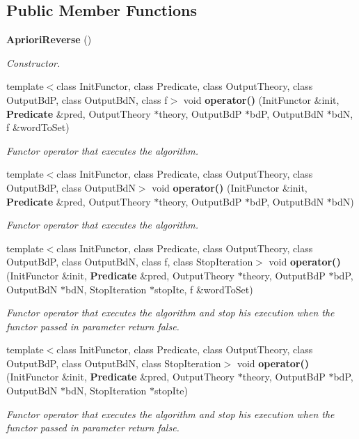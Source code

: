\subsection*{Public Member Functions}
\begin{CompactItemize}
\item 
{\bf Apriori\-Reverse} ()\label{class_apriori_reverse_18dd0f31ac2d8bc6d9036be8104bb6b8}

\begin{CompactList}\small\item\em Constructor. \item\end{CompactList}\item 
template$<$class Init\-Functor, class Predicate, class Output\-Theory, class Output\-Bd\-P, class Output\-Bd\-N, class f$>$ void {\bf operator()} (Init\-Functor \&init, {\bf Predicate} \&pred, Output\-Theory $\ast$theory, Output\-Bd\-P $\ast$bd\-P, Output\-Bd\-N $\ast$bd\-N, f \&word\-To\-Set)
\begin{CompactList}\small\item\em Functor operator that executes the algorithm. \item\end{CompactList}\item 
template$<$class Init\-Functor, class Predicate, class Output\-Theory, class Output\-Bd\-P, class Output\-Bd\-N$>$ void {\bf operator()} (Init\-Functor \&init, {\bf Predicate} \&pred, Output\-Theory $\ast$theory, Output\-Bd\-P $\ast$bd\-P, Output\-Bd\-N $\ast$bd\-N)
\begin{CompactList}\small\item\em Functor operator that executes the algorithm. \item\end{CompactList}\item 
template$<$class Init\-Functor, class Predicate, class Output\-Theory, class Output\-Bd\-P, class Output\-Bd\-N, class f, class Stop\-Iteration$>$ void {\bf operator()} (Init\-Functor \&init, {\bf Predicate} \&pred, Output\-Theory $\ast$theory, Output\-Bd\-P $\ast$bd\-P, Output\-Bd\-N $\ast$bd\-N, Stop\-Iteration $\ast$stop\-Ite, f \&word\-To\-Set)
\begin{CompactList}\small\item\em Functor operator that executes the algorithm and stop his execution when the functor passed in parameter return false. \item\end{CompactList}\item 
template$<$class Init\-Functor, class Predicate, class Output\-Theory, class Output\-Bd\-P, class Output\-Bd\-N, class Stop\-Iteration$>$ void {\bf operator()} (Init\-Functor \&init, {\bf Predicate} \&pred, Output\-Theory $\ast$theory, Output\-Bd\-P $\ast$bd\-P, Output\-Bd\-N $\ast$bd\-N, Stop\-Iteration $\ast$stop\-Ite)
\begin{CompactList}\small\item\em Functor operator that executes the algorithm and stop his execution when the functor passed in parameter return false. \item\end{CompactList}\end{CompactItemize}



